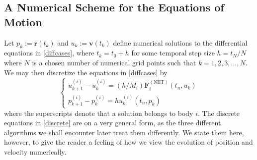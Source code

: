 	\subsection{A Numerical Scheme for the Equations of Motion}
	Let $p_k := \mathbf{r}(t_k)$ and $u_k := \mathbf{v}(t_k)$ define numerical solutions to the differential equations in \eqref{diffcases}, where $t_k = t_0 + h$ for some temporal step size $h = t_N /N$ where $N$ is a chosen number of numerical grid points such that $k = 1,2,3,...,N$. We may then discretize the equations in \eqref{diffcases} by
	\begin{equation}
		\begin{cases}
		u^{(i)}_{k+1} -u^{(i)}_k = (h/M_i)\mathbf{F}^{(\text{NET})}_i(t_n, u_k)\\
		 p^{(i)}_{k+1} - p^{(i)}_k = hu^{(i)}_k(t_n, p_k) 
		\end{cases}
		\label{discrete}
	\end{equation}
	where the superscripts denote that a solution belongs to body $i$. The discrete equations in \eqref{discrete} are on a very general form, as the three different algorithms we shall encounter later treat them differently. We state them here, however, to give the reader a feeling of how we view the evolution of position and velocity numerically.\\
	

